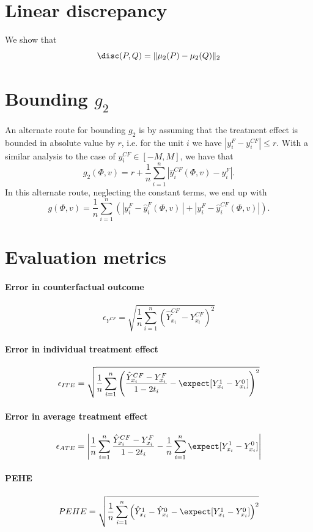 \section{Linear discrepancy}
\label{app:lindisc}
We show that
$$
\disc(P,Q) = \|\mu_2(P) - \mu_2(Q)\|_2
$$

\section{Bounding $g_2$}
An alternate route for bounding $g_2$ is by assuming that the treatment effect is bounded in absolute value by $r$, i.e. for the unit $i$ we have $|y^F_i - y^{CF}_i| \leq r$. With a similar analysis to the case of $y^{CF}_i \in [-M, M]$, we have that
$$g_2(\Phi,v) = r + \frac{1}{n} \sum_{i=1}^n |\hat{y}_i^{CF}(\Phi,v) - y_i^F|.$$
In this alternate route, neglecting the constant terms, we end up with $$g(\Phi,v) = \frac{1}{n} \sum_{i=1}^{n}\left( |y^F_i - \hat{y}_i^F(\Phi,v) \, | + |y_i^F - \hat{y}_i^{CF}(\Phi,v) | \right).$$

\section{Evaluation metrics}
\label{app:eval}

\paragraph{Error in counterfactual outcome}
$$
\epsilon_{Y^{CF}} = \sqrt{\frac{1}{n} \sum_{i=1}^n
\left(\hat{Y}^{CF}_{x_i} - Y^{CF}_{x_i}\right)^2}
$$

\paragraph{Error in individual treatment effect}
$$
\epsilon_{ITE} = \sqrt{\frac{1}{n} \sum_{i=1}^n
\left(\frac{\hat{Y}^{CF}_{x_i} - Y^{F}_{x_i}}{1-2t_i} - \expect[Y^1_{x_i}-Y^0_{x_i}]\right)^2}
$$

\paragraph{Error in average treatment effect}
$$
\epsilon_{ATE} = \left| \frac{1}{n} \sum_{i=1}^n
\frac{\hat{Y}^{CF}_{x_i} - Y^{F}_{x_i}}{1-2t_i} - \frac{1}{n} \sum_{i=1}^n \expect[Y^1_{x_i}-Y^0_{x_i}] \right|
$$

\paragraph{PEHE}
$$
PEHE = \sqrt{\frac{1}{n} \sum_{i=1}^n
\left(\hat{Y}^{1}_{x_i} - \hat{Y}^{0}_{x_i} - \expect[Y^1_{x_i}-Y^0_{x_i}]\right)^2}
$$
